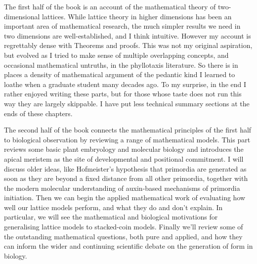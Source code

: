 The first half of the book is an account of the mathematical theory of two-dimensional lattices. While lattice theory in higher dimensions has been an important area of mathematical research, the much simpler results we need in two dimensions are well-established, and I think intuitive. However my account is regrettably dense with Theorems and proofs. This was not my original aspiration, but evolved as I tried to make sense of multiple overlapping concepts, and occasional mathematical untruths, in the phyllotaxis literature.  So there is in places a density of mathematical argument of the pedantic kind I learned to loathe when a graduate student many decades ago. To my surprise, in the end I rather enjoyed writing these parts, but for those whose taste does not run this way they are largely skippable. I have put less technical summary sections at the ends of these chapters.  


The second half of the book connects the mathematical principles of the first half to biological observation by reviewing a range of mathematical models. This part reviews some basic plant embryology and molecular biology and introduces the apical meristem as the site of developmental and positional commitment. I will discuss older ideas, like Hofmeister's hypothesis that primordia are generated as soon as they are beyond a fixed distance from all other primordia, together with the modern molecular understanding of  auxin-based mechanisms of primordia initiation. Then we can begin the applied mathematical work of evaluating how well our lattice models perform, and what they do and don't explain. In particular, we will see the mathematical and biological motivations for generalising lattice models to stacked-coin models. Finally we'll  review some of the outstanding mathematical questions, both pure and applied, and how they can inform the wider and continuing scientific debate on the generation of form in biology.






